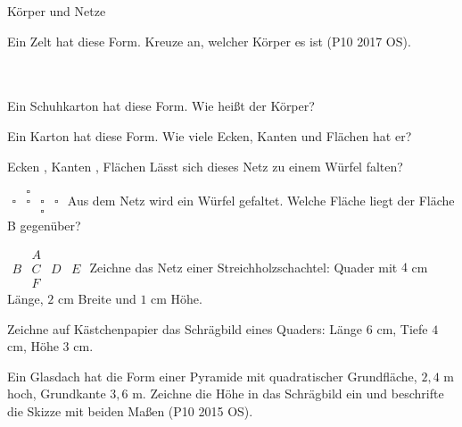 \setcounter{aufgabe}{8}

\begin{aufgabe}{Körper und Netze}
\begin{teile}
\teil Ein Zelt hat diese Form. Kreuze an, welcher Körper es ist \hfill (P10 2017 OS). \\  \\  \\ 

\teil Ein Schuhkarton hat diese Form. Wie heißt der Körper?

\leerfeld
\teil Ein Karton hat diese Form. Wie viele Ecken, Kanten und Flächen hat er?

Ecken \leerfeld , Kanten \leerfeld , Flächen \leerfeld
\teil Lässt sich dieses Netz zu einem Würfel falten? \janein

$\begin{array}{cccc}  & \square &  &  \\ \square & \square & \square & \square \\  &  & \square &  \end{array}$
\teil Aus dem Netz wird ein Würfel gefaltet. Welche Fläche liegt der Fläche B gegenüber?

$\begin{array}{cccc}  & A &  &  \\ B & C & D & E \\  & F &  &  \end{array}$
\leerfeld
\teil Zeichne das Netz einer Streichholzschachtel: Quader mit $4$ cm Länge, $2$ cm Breite und $1$ cm Höhe.

\teil Zeichne auf Kästchenpapier das Schrägbild eines Quaders: Länge $6$ cm, Tiefe $4$ cm, Höhe $3$ cm.

\teil Ein Glasdach hat die Form einer Pyramide mit quadratischer Grundfläche, $2{,}4$ m hoch, Grundkante $3{,}6$ m. Zeichne die Höhe in das Schrägbild ein und beschrifte die Skizze mit beiden Maßen \hfill (P10 2015 OS).


\end{teile}
\end{aufgabe}
